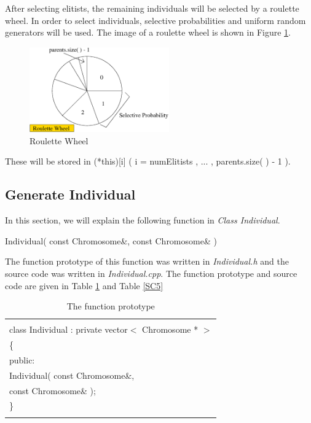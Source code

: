 \documentclass[twocolumn]{article}
\begin{document}
\noindent
After selecting elitists, the remaining individuals will be
selected by a roulette wheel. In order to select individuals,
selective probabilities and uniform random generators will be used. The
image of a roulette wheel is shown in Figure \ref{Roulette}.

\begin{figure}[h]
\begin{center}
\includegraphics[width=6cm]{selectLinear2.eps}
\caption{Roulette Wheel}
\label{Roulette}
\end{center}
\end{figure}

\noindent
These will be stored in (*this)[i] ( i = numElitists , ... , parents.size(
) - 1 ).

\subsection{Generate Individual}

\noindent
In this section, we will explain the following function in {\em Class
Individual}. 

\begin{center}
Individual( const Chromosome\&, const Chromosome\& )
\end{center}

\noindent
The function prototype of this function was written in {\em
Individual.h} and the source code was written in {\em
Individual.cpp}. The function prototype and source code are given in Table
\ref{FP5} and Table \ref{SC5}

\begin{table}[h]
\begin{center}
\caption{The function prototype}
\label{FP5}
{\scriptsize
\begin{tabular}{|l|}\hline
\hspace*{7cm}\\
class Individual : private vector$<$ Chromosome * $>$\\
\{\\
\hspace*{4mm} public:\\
\hspace*{8mm} Individual( const Chromosome\&, \\
\hspace*{12mm} const Chromosome\& );\\
\}\\
\hspace*{7cm}\\\hline
\end{tabular}
}
\end{center}
\end{table}
\end{document}
